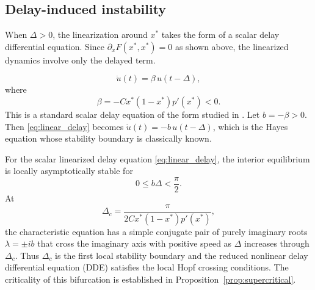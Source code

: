 \subsection{Delay-induced instability}

When $\Delta>0$, the linearization around $x^*$ takes the form of a scalar delay differential equation. Since $\partial_xF(x^*,x^*)=0$ as shown above, the linearized dynamics involve only the delayed term.

\begin{equation}
    \dot{u}(t)=\beta\, u(t-\Delta),
\label{eq:linear_delay}
\end{equation}
where
\begin{equation}
    \beta=-Cx^*(1-x^*)p'(x^*)<0.
\end{equation}
This is a standard scalar delay equation of the form studied in \citet{kuang1993delay}. Let $b=-\beta>0$. Then \eqref{eq:linear_delay} becomes $\dot{u}(t)=-b\,u(t-\Delta)$, which is the Hayes equation whose stability boundary is classically known.

\begin{theorem}
\label{thm:critical_delay}
For the scalar linearized delay equation \eqref{eq:linear_delay}, the interior equilibrium is locally asymptotically stable for
\[
0\le b\Delta < \frac{\pi}{2}.
\]
At
\begin{equation}
    \Delta_c=\frac{\pi}{2Cx^*(1-x^*)p'(x^*)},
\label{eq:deltac}
\end{equation}
the characteristic equation has a simple conjugate pair of purely imaginary roots $\lambda=\pm ib$ that cross the imaginary axis with positive speed as $\Delta$ increases through $\Delta_c$. Thus $\Delta_c$ is the first local stability boundary and the reduced nonlinear delay differential equation (DDE) satisfies the local Hopf crossing conditions. The criticality of this bifurcation is established in Proposition~\ref{prop:supercritical}.
\end{theorem}

